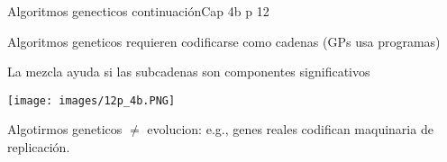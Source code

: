 \begin{frame}{Algoritmos genecticos continuación}{Cap 4b p 12}
\begin{right}

Algoritmos geneticos requieren codificarse como cadenas (GPs usa programas)

La mezcla ayuda si las subcadenas son componentes significativos

\end{right}

\begin{center}
\texttt{[image: images/12p\_4b.PNG]}
\end{center}
\begin{right}

Algotirmos geneticos $ \neq $ evolucion: e.g., genes reales codifican maquinaria de replicación.

\end{right}
\end{frame}
